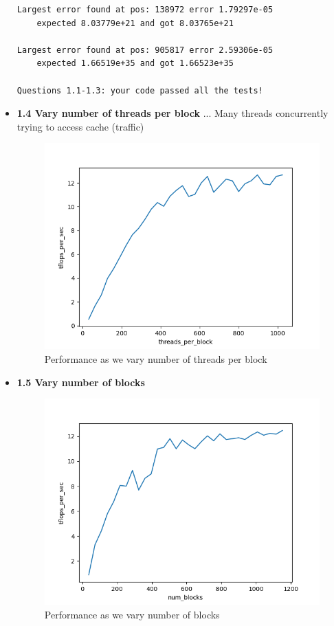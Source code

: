 \documentclass[12pt,letterpaper,twoside]{article}
\begin{document}
\begin{itemize}
\begin{verbatim}
Largest error found at pos: 138972 error 1.79297e-05 
    expected 8.03779e+21 and got 8.03765e+21

Largest error found at pos: 905817 error 2.59306e-05 
    expected 1.66519e+35 and got 1.66523e+35

Questions 1.1-1.3: your code passed all the tests!
\end{verbatim}

    \item \textbf{1.4 Vary number of threads per block} ... 
    Many threads concurrently trying to access cache (traffic)

    \begin{figure}[h]
        \center
        \includegraphics[scale=0.7]{q1_4.png}
        \caption{Performance as we vary number of threads per block}
    \end{figure}

    \item \textbf{1.5 Vary number of blocks}

    \begin{figure}[h]
        \center
        \includegraphics[scale=0.7]{q1_5.png}
        \caption{Performance as we vary number of blocks}
    \end{figure}


\end{itemize}
\end{document}
